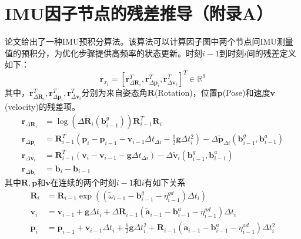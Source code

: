 \newpage
{}

\appendix
\section*{IMU因子节点的残差推导（附录A）}
\label{app1}
\setcounter{equation}{0}
\setcounter{section}{1}
论文\cite{forster2016manifold}给出了一种IMU预积分算法。该算法可以计算因子图中两个节点间IMU测量值的预积分，为优化步骤提供高频率的状态更新。时刻$i-1$到时刻$i$间的残差定义如下：
\begin{equation}
    \mathbf{r}_{x_i}=[\mathbf{r}^T_{\Delta\mathbf{R}_i}, \mathbf{r}^T_{\Delta\mathbf{p}_i},\mathbf{r}^T_{\Delta\mathbf{v}_i}]^T\in\mathbb{R}^9
\end{equation}
其中，$\mathbf{r}^T_{\Delta\mathbf{R}_i}, \mathbf{r}^T_{\Delta\mathbf{p}_i},\mathbf{r}^T_{\Delta\mathbf{v}_i}$分别为来自姿态角$\mathbf{R}$(Rotation)，位置$\mathbf{p}$(Pose)和速度$\mathbf{v}$(velocity)的残差项。\begin{equation}
    \begin{aligned}
        \mathbf{r}_{\Delta\mathbf{R}_i} &=\log\left(\Delta\tilde{\mathbf{R}}_{i}(\mathbf{b}_{i-1}^g)\right)\mathbf{R}_{i-1}^T\mathbf{R}_i  \\
        \mathbf{r}_{\Delta\mathbf{p}_i} &=\mathbf{R}_{i-1}^T\left(\mathbf{p}_i-\mathbf{p}_{i-1}-\mathbf{v}_{i-1}\Delta t_{\Delta i}-\frac{1}{2}\mathbf{g}\Delta t_{i}^2\right) -\Delta\tilde{\mathbf{p}}_{\Delta i}(\mathbf{b}_{i-1}^g,\mathbf{b}_{i-1}^a) \\
        \mathbf{r}_{\Delta\mathbf{v}_i} &=\mathbf{R}_{i-1}^T\left(\mathbf{v}_i-\mathbf{v}_{i-1}-\mathbf{g}\Delta t_{\Delta i}\right) -\Delta\tilde{\mathbf{v}}_{i}(\mathbf{b}^g_{i-1},\mathbf{b}^a_{i-1})  \\
        \mathbf{r}_{\Delta\mathbf{b}_i} &=\mathbf{b}_i-\mathbf{b}_{i-1} 
        \end{aligned}
\end{equation}
其中$\mathbf{R},\mathbf{p}$和$\mathbf{v}$在连续的两个时刻$i-1$和$i$有如下关系
\begin{equation}
    \begin{aligned}
        \mathbf{R}_i&=\mathbf{R}_{i-1}\exp\left(\left(\widetilde{\omega}_{i-1}-\mathbf{b}_{i-1}^g-\eta_{i-1}^{gd}\right)\Delta t_i\right)\\
        \mathbf{v}_i&=\mathbf{v}_{i-1}+\mathbf{g}\Delta t_i+\Delta\mathbf{R}_{i-1}\left(\widetilde{\mathbf{a}}_{i-1}-\mathbf{b}_{i-1}^a-\eta_{i-1}^{ad}\right)\Delta t_i\\
        \mathbf{p}_i&=\mathbf{p}_{i-1}+\mathbf{v}_{i-1}\Delta t_i+\frac{1}{2}\mathbf{g}\Delta t_i^2+\mathbf{R}_{i-1}\left(\widetilde{\mathbf{a}}_{i-1}-\mathbf{b}_{i-1}^a-\eta_{i-1}^{ad}\right)\Delta t_i^2
    \end{aligned}
\end{equation}
